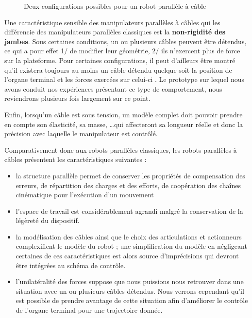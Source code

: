\begin{figure}[!ht]
  \centering
      \hfill
    \caption{\footnotesize Deux configurations possibles pour un robot parallèle à câble}
\label{intro:fig5}
\end{figure}

Une caractéristique sensible des manipulateurs parallèles à câbles qui les différencie des manipulateurs parallèles classiques est la {\bf non-rigidité des jam\-bes}. Sous certaines conditions, un ou plusieurs câbles peuvent être détendus, ce qui a pour effet 1/ de modifier leur géométrie, 2/ ils n'exercent plus de force sur la plateforme. Pour certaines configurations, il peut d'ailleurs être montré qu'il existera toujours au moins un câble détendu quelque-soit la position de l'organe terminal et les forces exercées sur celui-ci \cite{2011:Carricato.Merlet}. Le prototype sur lequel nous avons conduit nos expériences présentant ce type de comportement, nous reviendrons plusieurs fois largement sur ce point.

Enfin, lorsqu'un câble est sous tension, un modèle complet doit pouvoir prendre en compte son élasticité, sa masse, \dots qui affecteront sa longueur réelle et donc la précision avec laquelle le manipulateur est contrôlé.

Comparativement donc aux robots parallèles classiques, les robots parallèles à câbles présentent les caractéristiques suivantes :
\begin{itemize}
 \item la structure parallèle permet de conserver les propriétés de compensation des erreurs, de répartition des charges et des efforts, de coopération des chaînes cinématique pour l'exécution d'un mouvement
 \item l'espace de travail est considérablement agrandi malgré la conservation de la légèreté du dispositif.
 \item la modélisation des câbles ainsi que le choix des articulations et actionneurs complexifient le modèle du robot ; une simplification du modèle en négligeant certaines de ces caractéristiques est alors source d'imprécisions qui devront être intégrées au schéma de contrôle.
 \item l'unilatéralité des forces suppose que nous puissions nous retrouver dans une situation avec un ou plusieurs câbles détendus. Nous verrons cependant qu'il est possible de prendre avantage de cette situation afin d'amélio\-rer le contrôle de l'organe terminal pour une trajectoire donnée.
\end{itemize}

